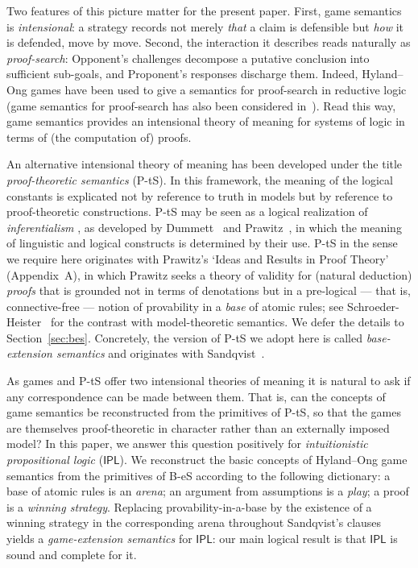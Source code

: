 \documentclass{lipics-v2021}
\newcommand{\IPL}{\textsf{IPL}}
\begin{document}
Two features of this picture matter for the present paper. First, game semantics is \emph{intensional}: a strategy records not merely \emph{that} a claim is defensible but \emph{how} it is defended, move by move. Second, the interaction it describes reads naturally as \emph{proof-search}: Opponent's challenges decompose a putative conclusion into sufficient sub-goals, and Proponent's responses discharge them. Indeed, Hyland--Ong games have been used to give a semantics for proof-search in reductive logic~\cite{Pym_ReductiveLogic} (game semantics for proof-search has also been considered in~\cite{MS2006}). Read this way, game semantics provides an intensional theory of meaning for systems of logic in terms of (the computation of) proofs. 
 
An alternative intensional theory of meaning has been developed under the title \emph{proof-theoretic semantics} (P-tS). In this framework, the meaning of the logical constants is explicated not by reference to truth in models but by reference to proof-theoretic constructions. P-tS may be seen as a logical realization of \emph{inferentialism} \cite{Brandom1994,Brandom2000,Brandom2024}, as developed by Dummett~\cite{Dummett1975,Dummett1991} and Prawitz~\cite{Prawitz1971ideas,Prawitz2006meaning}, in which the meaning of linguistic and logical constructs is determined by their use. P-tS in the sense we require here originates with Prawitz's `Ideas and Results in Proof Theory'~\cite{Prawitz1971ideas} (Appendix~A), in which Prawitz seeks a theory of validity for (natural deduction) \emph{proofs} that is grounded not in terms of denotations but in a pre-logical --- that is, connective-free --- notion of provability in a \emph{base} of atomic rules; see Schroeder-Heister~\cite{Schroeder2007modelvsproof} for the contrast with model-theoretic semantics. We defer the details to Section~\ref{sec:bes}. Concretely, the version of P-tS we adopt here is called \emph{base-extension semantics} and originates with Sandqvist~\cite{Sandqvist2005inferentialist,Sandqvist_Tor}.
 
As games and P-tS offer two intensional theories of meaning it is natural to ask if any correspondence can be made between them. That is, can the concepts of game semantics be reconstructed from the primitives of P-tS, so that the games are themselves proof-theoretic in character rather than an externally imposed model? 
In this paper, we answer this question positively for \emph{intuitionistic propositional logic} ($\IPL$). We reconstruct the basic concepts of Hyland--Ong game semantics from the primitives of B-eS according to the following dictionary: a base of atomic rules is an \emph{arena}; an argument from assumptions is a \emph{play}; a proof is a \emph{winning strategy}. Replacing provability-in-a-base by the existence of a winning strategy in the corresponding arena throughout Sandqvist's clauses yields a \emph{game-extension semantics} for $\IPL$: our main logical result is that $\IPL$ is sound and complete for it.  
 
\end{document}
